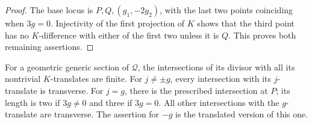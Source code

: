 \begin{proof}
The base locus is $P,Q,(g_1,-2g_2)$, with the last two points
coinciding when $3g=0$. Injectivity of the first projection of $K$
shows that the third point has no $K$-difference with either of the
first two unless it is $Q$. This proves both remaining assertions.
\end{proof}

\begin{lemma}
\label{lem:ss-contact-pair-covers}
For a geometric generic section of $\mathcal Q$, the intersections
of its divisor with all its nontrivial $K$-translates are finite.
For $j\ne\pm g$, every intersection with its $j$-translate is
transverse. For $j=g$, there is the prescribed intersection at $P$;
its length is two if $3g\ne0$ and three if $3g=0$. All other
intersections with the $g$-translate are transverse. The assertion
for $-g$ is the translated version of this one.
\end{lemma}
